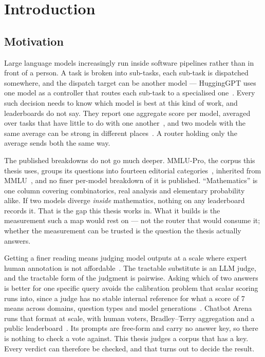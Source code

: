 \chapter{Introduction}\label{ch:introduction}

\section{Motivation}\label{sec:motivation}

Large language models increasingly run inside software pipelines rather
than in front of a person. A task is broken into sub-tasks, each
sub-task is dispatched somewhere, and the dispatch target can be
another model --- HuggingGPT uses one model as a controller that routes
each sub-task to a specialised one~\parencite{shen2023hugginggpt}.
Every such decision needs to know which model is best at this kind of
work, and leaderboards do not say. They
report one aggregate score per model, averaged over tasks that have
little to do with one another~\parencite{boubdir2024elo}, and two
models with the same average can be strong in different
places~\parencite{raju2024constructing}. A router holding only the
average sends both the same way.

The published breakdowns do not go much deeper. MMLU-Pro, the corpus
this thesis uses, groups its questions into fourteen editorial
categories~\parencite{wang2024mmlupro}, inherited from
MMLU~\parencite{hendrycks2021measuring}, and no finer per-model
breakdown of it is published. ``Mathematics'' is one column covering
combinatorics, real analysis and elementary probability alike. If two
models diverge \emph{inside} mathematics, nothing on any leaderboard
records it. That is the gap this thesis works in. What it builds is
the measurement such a map would rest on --- not the router that
would consume it; whether the measurement can be trusted is the
question the thesis actually answers.

Getting a finer reading means judging model outputs at a scale where
expert human annotation is not
affordable~\parencite{zheng2023judging}. The tractable substitute is an
LLM judge, and the tractable form of the judgment is pairwise. Asking
which of two answers is better for one specific query avoids the
calibration problem that scalar scoring runs into, since a judge has no
stable internal reference for what a score of 7 means across domains,
question types and model generations~\parencite{zheng2023judging}.
Chatbot Arena runs that format at scale, with human voters,
Bradley--Terry aggregation and a public
leaderboard~\parencite{chiang2024chatbotarena}. Its prompts are
free-form and carry no answer key, so there is nothing to check a
vote against. This thesis judges a corpus
that has a key. Every verdict can therefore be checked, and that turns
out to decide the result.

